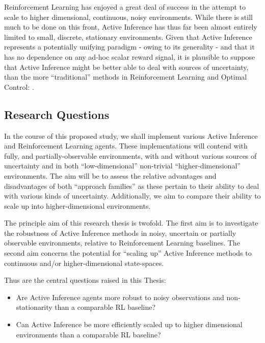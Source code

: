\documentclass[12pt, oneside]{article}
\begin{document}
Reinforcement Learning has enjoyed a great deal of success in the attempt to scale to higher dimensional, continuous, noisy environments. While there is still much to be done on this front, Active Inference has thus far been almost entirely limited to small, discrete, stationary environments. Given that Active Inference represents a potentially unifying paradigm - owing to its generality - and that it has no dependence on any ad-hoc scalar reward signal, it is plausible to suppose that Active Inference might be better able to deal with sources of uncertainty, than the more ``traditional'' methods in Reinforcement Learning and Optimal Control: \textcite{RL-or-AIF}. 


\subsection{Research Questions}
In the course of this proposed study, we shall implement various Active Inference and Reinforcement Learning agents. These implementations will contend with fully, and partially-observable environments, with and without various sources of uncertainty and in both ``low-dimensional'' non-trivial ``higher-dimensional'' environments. The aim will be to assess the relative advantages and disadvantages of both ``approach families'' as these pertain to their ability to deal with various kinds of uncertainty. Additionally, we aim to compare their ability to scale up into higher-dimensional environments.    
 
The principle aim of this research thesis is twofold. The first aim is to investigate the robustness of Active Inference methods in noisy, uncertain or partially observable environments, relative to Reinforcement Learning baselines. The second aim concerns the potential for ``scaling up'' Active Inference methods to continuous and/or higher-dimensional state-spaces. 

Thus are the central questions raised in this Thesis:

\begin{itemize}
\item Are Active Inference agents more robust to noisy observations and non-stationarity than a comparable RL baseline?
\item Can Active Inference be more efficiently scaled up to higher dimensional environments than a comparable RL baseline? 
\end{itemize} 
\end{document}
